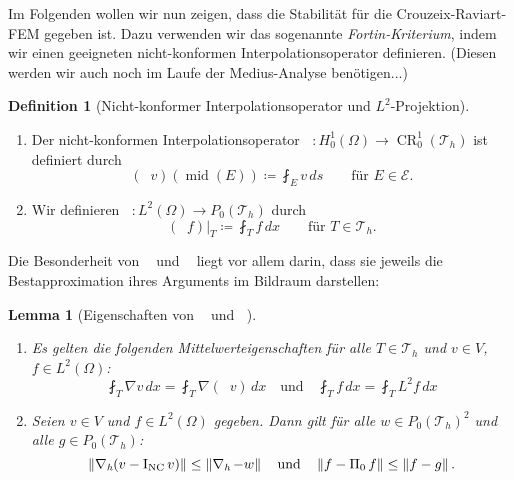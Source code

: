 \documentclass[a4paper]{scrartcl}
\newcommand{\Hzero}{H_0^1}
\newcommand{\Ltwo}{L^2}
\newcommand{\crfem}{\operatorname{CR}_0^1}
\newcommand{\mesh}{\mathcal{T}_h}
\newcommand{\edges}{\mathcal{E}}
\newcommand{\dx}{\,dx}
\newcommand{\norm}[1]{\left\lVert#1\right\rVert}
\DeclareMathOperator{\nablah}{\nabla_{\emph{h}}}
\DeclareMathOperator{\midOp}{mid}
\DeclareMathOperator{\intOp}{I_{NC}}
\DeclareMathOperator{\LtwoOp}{\Pi_0}
\theoremstyle{plain}
\newtheorem{lemma}{Lemma}
\theoremstyle{definition}
\newtheorem{definition}{Definition}
\theoremstyle{remark}
\begin{document}
\noindent Im Folgenden wollen wir nun zeigen, dass die Stabilität für die
Crouzeix-Raviart-FEM gegeben ist. Dazu verwenden wir das sogenannte
\emph{Fortin-Kriterium}, indem wir einen geeigneten nicht-konformen
Interpolationsoperator definieren. {\color{red}(Diesen werden wir auch noch im
Laufe der Medius-Analyse benötigen...)}

\begin{definition}[Nicht-konformer Interpolationsoperator und
  \(\Ltwo\)-Projektion] \label{def:2}
  \begin{enumerate}[label=\emph{(\roman*)}]
  \item Der nicht-konformen Interpolationsoperator \(\intOp\colon
    \Hzero(\Omega) \rightarrow \crfem(\mesh)\) ist definiert durch
    \begin{equation}
      \label{eq:15}
      (\intOp v)(\midOp(E)) \coloneqq \fint_E v \,ds \qquad \text{für } E \in \edges. 
    \end{equation}
  \item Wir definieren \(\LtwoOp \colon \Ltwo(\Omega) \rightarrow
    P_0(\mesh)\) durch 
    \begin{equation}
      \label{eq:13}
      (\LtwoOp f)|_T \coloneqq \fint_T f \dx \qquad \text{für } T\in \mesh. 
    \end{equation}
  \end{enumerate}
\end{definition}

Die Besonderheit von \(\intOp\) und \(\LtwoOp\) liegt vor allem
darin, dass sie jeweils die Bestapproximation ihres Arguments im
Bildraum darstellen: 

\begin{lemma}[Eigenschaften von \(\intOp\) und \(\LtwoOp\)] \label{lem:1}
  \begin{enumerate}[label=(\roman*)]
  \item Es gelten die folgenden Mittelwerteigenschaften für alle 
    \(T\in\mesh\) und \(v\in V\), \(f\in\Ltwo(\Omega)\): 
    \begin{equation}
      \label{eq:16}
      \fint_T \nabla v \dx = \fint_T \nabla(\intOp v) \dx \quad \text{und} \quad
      \fint_T f \dx = \fint_T \Ltwo f \dx 
    \end{equation}
  \item Seien \(v\in V\) und \(f\in \Ltwo(\Omega)\) gegeben. Dann gilt
    für alle \(w\in P_0(\mesh)^2\) und alle \(g\in P_0(\mesh)\): 
    \begin{equation}
      \label{eq:17}
      \norm{\nablah(v-\intOp v)} \leq \norm{\nablah - w} \quad
      \text{und} \quad \norm{f-\LtwoOp f} \leq \norm{f-g}. 
    \end{equation}
  \end{enumerate}
\end{lemma}
\end{document}
